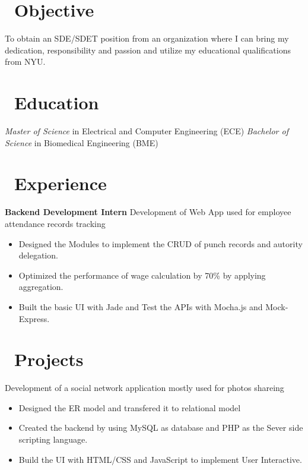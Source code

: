 \documentclass{resume}
\begin{document}



\section{\faUser\ Objective}
To obtain an SDE/SDET position from an organization where I can bring my dedication, responsibility and
passion and utilize my educational qualifications from NYU.
 
\section{\faGraduationCap\ Education}
\textit{Master of Science} in Electrical and Computer Engineering (ECE)
\textit{Bachelor of Science} in Biomedical Engineering (BME)

\section{\faUsers\ Experience}
\textbf{Backend Development Intern}
Development of Web App used for employee attendance records tracking
\begin{itemize}
  \item Designed the Modules to implement the CRUD of punch records and autority delegation.
  \item Optimized the performance of wage calculation by 70\% by applying aggregation.
  \item Built the basic UI with Jade and Test the APIs with Mocha.js and Mock-Express.
\end{itemize}

\section{\faCogs\ Projects}
Development of a social network application mostly used for photos shareing
\begin{itemize}
  \item Designed the ER model and transfered it to relational model
  \item Created the backend by using MySQL as database and PHP as the Sever side scripting language. 
  \item Build the UI with HTML/CSS and JavaScript to implement User Interactive.
\end{itemize}
\end{document}

